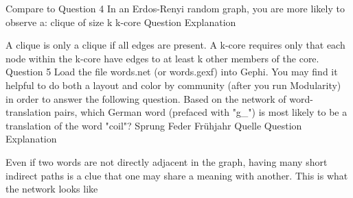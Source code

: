 Compare  to 
Question 4
In an Erdos-Renyi random graph, you are more likely to observe a:
clique of size k
k-core
Question Explanation

A clique is only a clique if all edges are present. A k-core requires only that each node within the k-core have edges to at least k other members of the core.
Question 5
Load the file words.net (or words.gexf) into Gephi. You may find it helpful to do both a layout and color by community (after you run Modularity) in order to answer the following question. Based on the network of word-translation pairs, which German word (prefaced with "g_") is most likely to be a translation of the word "coil"?
Sprung
Feder
Frühjahr
Quelle
Question Explanation

Even if two words are not directly adjacent in the graph, having many short indirect paths is a clue that one may share a meaning with another. This is what the network looks like
